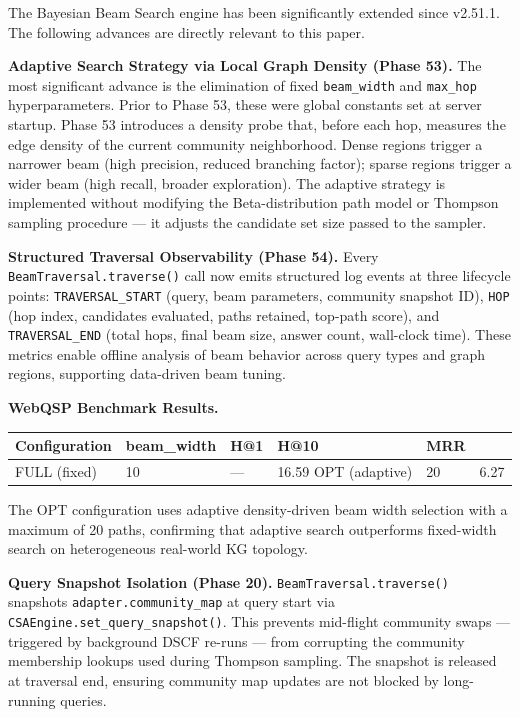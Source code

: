 The Bayesian Beam Search engine has been significantly extended since v2.51.1. The following advances are directly relevant to this paper.

\textbf{Adaptive Search Strategy via Local Graph Density (Phase 53).} The most significant advance is the elimination of fixed \texttt{beam\_width} and \texttt{max\_hop} hyperparameters. Prior to Phase 53, these were global constants set at server startup. Phase 53 introduces a density probe that, before each hop, measures the edge density of the current community neighborhood. Dense regions trigger a narrower beam (high precision, reduced branching factor); sparse regions trigger a wider beam (high recall, broader exploration). The adaptive strategy is implemented without modifying the Beta-distribution path model or Thompson sampling procedure --- it adjusts the candidate set size passed to the sampler.

\textbf{Structured Traversal Observability (Phase 54).} Every \texttt{BeamTraversal.traverse()} call now emits structured log events at three lifecycle points: \texttt{TRAVERSAL\_START} (query, beam parameters, community snapshot ID), \texttt{HOP} (hop index, candidates evaluated, paths retained, top-path score), and \texttt{TRAVERSAL\_END} (total hops, final beam size, answer count, wall-clock time). These metrics enable offline analysis of beam behavior across query types and graph regions, supporting data-driven beam tuning.

\textbf{WebQSP Benchmark Results.}

\begin{table}[h]
\small\centering
\begin{tabular}{lllll}
\toprule
Configuration & beam_width & H@1 & H@10 & MRR \\
\midrule
FULL (fixed) & 10 & --- & 16.59%
OPT (adaptive) & 20 & 6.27%
\bottomrule
\end{tabular}
\end{table}


The OPT configuration uses adaptive density-driven beam width selection with a maximum of 20 paths, confirming that adaptive search outperforms fixed-width search on heterogeneous real-world KG topology.

\textbf{Query Snapshot Isolation (Phase 20).} \texttt{BeamTraversal.traverse()} snapshots \texttt{adapter.community\_map} at query start via \texttt{CSAEngine.set\_query\_snapshot()}. This prevents mid-flight community swaps --- triggered by background DSCF re-runs --- from corrupting the community membership lookups used during Thompson sampling. The snapshot is released at traversal end, ensuring community map updates are not blocked by long-running queries.

